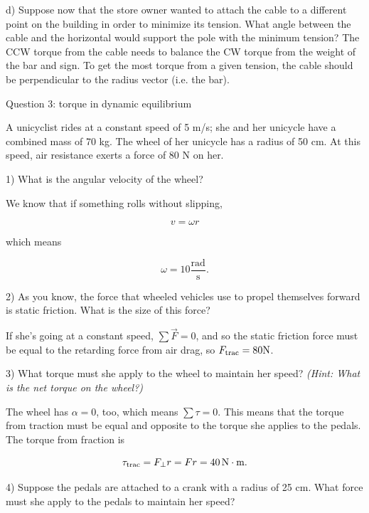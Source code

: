 \documentclass[12pt]{article}
\begin{document}
\vspace{3 in}

d) Suppose now that the store owner wanted to attach the cable to a different point on the building in order to minimize its tension. What angle between the
cable and the horizontal would support the pole with the minimum tension?
{\color{red}The CCW torque from the cable needs to balance the CW torque from the weight of the bar and sign. To get the most torque from a given tension, the cable should be perpendicular to the radius vector (i.e. the bar).
}

\newpage

\centerline{\large Question 3: torque in dynamic equilibrium}

A unicyclist rides at a constant speed of 5 m/s; she and her unicycle have a combined mass of 70 kg. The wheel of her unicycle has a radius of 50 cm. At this speed, air resistance exerts a force of 80 N on her.


1) What is the angular velocity of the wheel?
\vspace{1.2in}

{\color{red}
	
	We know that if something rolls without slipping, 
	
	$$v = \omega r$$
	
	which means 
	
	$$\omega = 10 \frac{\text{rad}}{\text{s}}.$$
}


2) As you know, the force that wheeled vehicles use to propel themselves forward is static friction. What is the size of this force?
\vspace {1.2in}

{\color{red} If she's going at a constant speed, $\sum \vec F = 0$, and so the static friction force must be equal to the retarding force from air drag, so $F_{\rm{trac}} = 80 \rm N$.}

3) What torque must she apply to the wheel to maintain her speed? \textit{(Hint: What is the net torque on the wheel?)}
\vspace{2in}

{\color{red} The wheel has $\alpha = 0$, too, which means $\sum \tau = 0$. This means that the torque from traction must be equal and opposite to the torque she applies to the pedals. The torque from fraction is 
	
	$$\tau_{\rm {trac}} = F_\perp r = Fr = 40\,\rm N\cdot \rm m.$$
}

\newpage

4) Suppose the pedals are attached to a crank with a radius of 25 cm. What force must she apply to the pedals to maintain her speed?
\vspace{3in}
\end{document}
